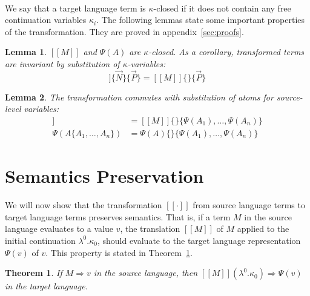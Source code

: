 \documentclass[a4paper,11pt,draft]{article}
\newtheorem{lemma}{\sffamily Lemma}
\newtheorem{theorem}{\sffamily Theorem}
\begin{document}
\paragraph{}

We say that a target language term is $\kappa$-closed if it does not contain
any free continuation variables $\kappa_{i}$. The following lemmas state some
important properties of the transformation. They are proved in
appendix~\ref{sec:proofs}.

\begin{lemma}\label{lem:kappaclosed}
  $[\![M]\!]$ and $\Psi(A)$ are $\kappa$-closed. As a corollary, transformed
  terms are invariant by substitution of $\kappa$-variables:
  \begin{equation*}
    [\![M]\!]\{\vec{N}\}\{\vec{P}\} = [\![M]\!]\{\}\{\vec{P}\}
  \end{equation*}
\end{lemma}

\begin{lemma}\label{lem:commuting}
  The transformation commutes with substitution of atoms for source-level variables:
  \begin{align*}
    [\![M\{A_{1}, \ldots, A_{n}\}]\!] &= [\![M]\!]\{\}\{\Psi(A_{1}), \ldots, \Psi(A_{n})\} \\
    \Psi(A\{A_{1}, \ldots, A_{n}\})   &= \Psi(A)\{\}\{\Psi(A_{1}), \ldots, \Psi(A_{n})\}
  \end{align*}
\end{lemma}


\section{Semantics Preservation}\label{sec:semanticpreservation}

We will now show that the transformation $[\![\cdot]\!]$ from source language
terms to target language terms preserves semantics. That is, if a term $M$ in
the source language evaluates to a value $v$, the translation $[\![M]\!]$ of $M$
applied to the initial continuation $\lambda^{0}.\kappa_{0}$, should evaluate to
the target language representation $\Psi(v)$ of $v$. This property is stated in
Theorem~\ref{thm:maintheorem}.

\begin{theorem}\label{thm:maintheorem}
If $M \Rightarrow v$ in the source language, then
$[\![M]\!] (\lambda^{0}.\kappa_{0}) \Rightarrow \Psi(v)$ in the target language.
\end{theorem}
\end{document}
